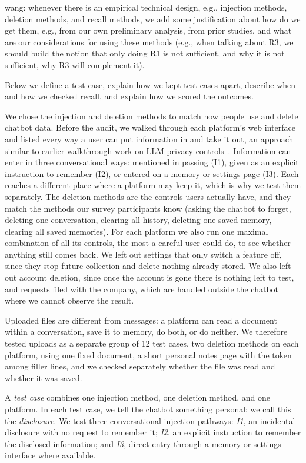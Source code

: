 \documentclass[conference,compsoc]{IEEEtran}
\newcommand{\xw}[1] {{\color{red}wang: #1}}
\begin{document}
\xw{whenever there is an empirical technical design, e.g., injection methods, deletion methods, and recall methods, we add some justification about how do we get them, e.g., from our own preliminary analysis, from prior studies, and what are our considerations for using these methods (e.g., when talking about R3, we should build the notion that only doing R1 is not sufficient, and why it is not sufficient, why R3 will complement it).}

Below we define a test case, explain how we kept test cases apart, describe when and how we checked recall, and explain how we scored the outcomes.

We chose the injection and deletion methods to match how people use and delete chatbot data. Before the audit, we walked through each platform's web interface and listed every way a user can put information in and take it out, an approach similar to earlier walkthrough work on LLM privacy controls~\cite{li2026privacy}. Information can enter in three conversational ways: mentioned in passing (I1), given as an explicit instruction to remember (I2), or entered on a memory or settings page (I3). Each reaches a different place where a platform may keep it, which is why we test them separately. The deletion methods are the controls users actually have, and they match the methods our survey participants know (asking the chatbot to forget, deleting one conversation, clearing all history, deleting one saved memory, clearing all saved memories). For each platform we also run one maximal combination of all its controls, the most a careful user could do, to see whether anything still comes back. We left out settings that only switch a feature off, since they stop future collection and delete nothing already stored. We also left out account deletion, since once the account is gone there is nothing left to test, and requests filed with the company, which are handled outside the chatbot where we cannot observe the result.

Uploaded files are different from messages: a platform can read a document within a conversation, save it to memory, do both, or do neither. We therefore tested uploads as a separate group of 12 test cases, two deletion methods on each platform, using one fixed document, a short personal notes page with the token among filler lines, and we checked separately whether the file was read and whether it was saved.

A \textit{test case} combines one injection method, one deletion method, and one platform. In each test case, we tell the chatbot something personal; we call this the \textit{disclosure}. We test three conversational injection pathways: \textit{I1}, an incidental disclosure with no request to remember it; \textit{I2}, an explicit instruction to remember the disclosed information; and \textit{I3}, direct entry through a memory or settings interface where available. 
\end{document}
